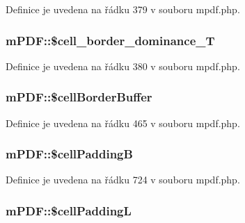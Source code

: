 Definice je uvedena na řádku 379 v souboru mpdf.\-php.

\hypertarget{classm_p_d_f_a324ae1ed91f3df8da964ac7d14840397}{
\subsubsection[{\$cell\-\_\-border\-\_\-dominance\-\_\-\-T}]{\setlength{\rightskip}{0pt plus 5cm}m\-P\-D\-F\-::\$cell\-\_\-border\-\_\-dominance\-\_\-\-T}}\label{classm_p_d_f_a324ae1ed91f3df8da964ac7d14840397}


Definice je uvedena na řádku 380 v souboru mpdf.\-php.

\hypertarget{classm_p_d_f_a8bbaccbfc5efb3febf4ed8676524d6d4}{
\subsubsection[{\$cell\-Border\-Buffer}]{\setlength{\rightskip}{0pt plus 5cm}m\-P\-D\-F\-::\$cell\-Border\-Buffer}}\label{classm_p_d_f_a8bbaccbfc5efb3febf4ed8676524d6d4}


Definice je uvedena na řádku 465 v souboru mpdf.\-php.

\hypertarget{classm_p_d_f_a5b604343e40ec0c4d7852188f441b065}{
\subsubsection[{\$cell\-Padding\-B}]{\setlength{\rightskip}{0pt plus 5cm}m\-P\-D\-F\-::\$cell\-Padding\-B}}\label{classm_p_d_f_a5b604343e40ec0c4d7852188f441b065}


Definice je uvedena na řádku 724 v souboru mpdf.\-php.

\hypertarget{classm_p_d_f_ac8139121aec5ed7643ca1b773451a3bb}{
\subsubsection[{\$cell\-Padding\-L}]{\setlength{\rightskip}{0pt plus 5cm}m\-P\-D\-F\-::\$cell\-Padding\-L}}\label{classm_p_d_f_ac8139121aec5ed7643ca1b773451a3bb}


